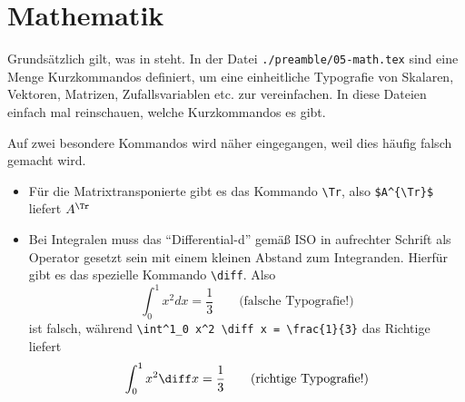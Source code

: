 \section{Mathematik}%
\label{sec:Mathe}
%
Grundsätzlich gilt, was in \parencites{ams1999a}{ams1999b} steht. In der Datei
\texttt{./preamble/05-math.tex} sind eine Menge Kurzkommandos definiert, um eine
einheitliche Typografie von Skalaren, Vektoren,
Matrizen, Zufallsvariablen etc.
zur vereinfachen. In diese Dateien einfach mal reinschauen, welche Kurzkommandos
es gibt.

Auf zwei besondere Kommandos wird näher eingegangen, weil dies häufig falsch
gemacht wird.
\begin{itemize}
  \item Für die Matrixtransponierte gibt es das Kommando \verb#\Tr#, also
	\verb#$A^{\Tr}$# liefert $A^{\Tr}$
	
	\item Bei Integralen muss das \enquote{Differential-d} gemäß
	ISO in aufrechter Schrift als Operator gesetzt sein mit einem kleinen Abstand
	zum Integranden. Hierfür gibt es das spezielle Kommando \verb#\diff#. Also
	\begin{equation}
	 \int^1_0 x^2 d x = \frac{1}{3} \qquad \text{(falsche Typografie!)}
	\end{equation}
	ist falsch, während \verb#\int^1_0 x^2 \diff x = \frac{1}{3}# das Richtige
	liefert
	\begin{equation}
	 \int^1_0 x^2 \diff x = \frac{1}{3} \qquad \text{(richtige Typografie!)}
	\end{equation}
\end{itemize}
